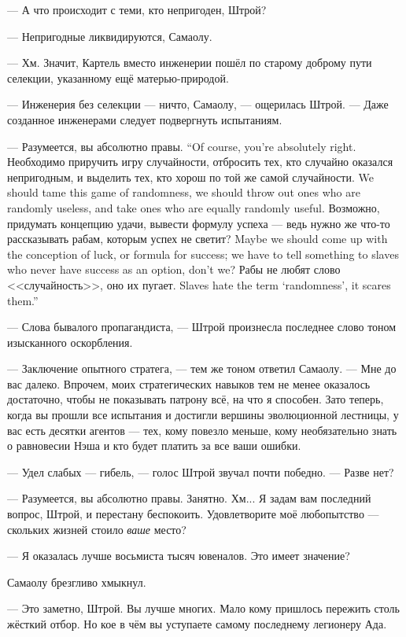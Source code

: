 --- А что происходит с теми, кто непригоден, Штрой?

--- Непригодные ликвидируются, Самаолу.

--- Хм.
Значит, Картель вместо инженерии пошёл по старому доброму пути селекции, указанному ещё матерью-природой.

--- Инженерия без селекции --- ничто, Самаолу, --- ощерилась Штрой.
--- Даже созданное инженерами следует подвергнуть испытаниям.

{--- Разумеется, вы абсолютно правы.}
{``Of course, you're absolutely right.}
{Необходимо приручить игру случайности, отбросить тех, кто случайно оказался непригодным, и выделить тех, кто хорош по той же самой случайности.}
{We should tame this game of randomness, we should throw out ones who are randomly useless, and take ones who are equally randomly useful.}
{Возможно, придумать концепцию удачи, вывести формулу успеха --- ведь нужно же что-то рассказывать рабам, которым успех не светит?}
{Maybe we should come up with the conception of luck, or formula for success; we have to tell something to slaves who never have success as an option, don't we?}
{Рабы не любят слово <<случайность>>, оно их пугает.}
{Slaves hate the term `randomness', it scares them.''}

--- Слова бывалого пропагандиста, --- Штрой произнесла последнее слово тоном изысканного оскорбления.

--- Заключение опытного стратега, --- тем же тоном ответил Самаолу.
--- Мне до вас далеко.
Впрочем, моих стратегических навыков тем не менее оказалось достаточно, чтобы не показывать патрону всё, на что я способен.
Зато теперь, когда вы прошли все испытания и достигли вершины эволюционной лестницы, у вас есть десятки агентов --- тех, кому повезло меньше, кому необязательно знать о равновесии Нэша и кто будет платить за все ваши ошибки.

--- Удел слабых --- гибель, --- голос Штрой звучал почти победно.
--- Разве нет?

--- Разумеется, вы абсолютно правы.
Занятно.
Хм...
Я задам вам последний вопрос, Штрой, и перестану беспокоить.
Удовлетворите моё любопытство --- скольких жизней стоило \emph{ваше} место?

--- Я оказалась лучше восьмиста тысяч ювеналов.
Это имеет значение?

Самаолу брезгливо хмыкнул.

--- Это заметно, Штрой.
Вы лучше многих.
Мало кому пришлось пережить столь жёсткий отбор.
Но кое в чём вы уступаете самому последнему легионеру Ада.

